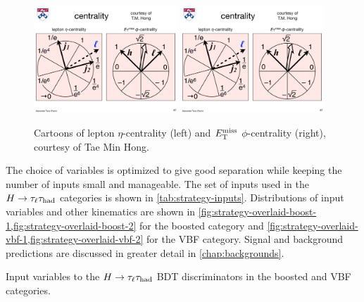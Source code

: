 \begin{figure}[tp]
  \centering
  \includegraphics[width=0.48\textwidth]{figures/backgrounds/cartoon_lepton_eta_centrality}
  \includegraphics[width=0.48\textwidth]{figures/backgrounds/cartoon_met_phi_centrality}
  \caption{Cartoons of lepton $\eta$-centrality (left) and $E_{\mathrm{T}}^{\mathrm{miss}}$ $\phi$-centrality (right), courtesy of Tae Min Hong.}
  \label{fig:strategy-centrality-cartoons}
\end{figure}

The choice of variables is optimized to give good separation while keeping the number of inputs small and manageable. The set of inputs used in the $H\rightarrow\tau_\ell\tau_\text{had}$ categories is shown in \cref{tab:strategy-inputs}. Distributions of input variables and other kinematics are shown in \cref{fig:strategy-overlaid-boost-1,fig:strategy-overlaid-boost-2} for the boosted category and \cref{fig:strategy-overlaid-vbf-1,fig:strategy-overlaid-vbf-2} for the VBF category. Signal and background predictions are discussed in greater detail in \cref{chap:backgrounds}.

\begin{table}[bp]
  \centering
  \renewcommand{\arraystretch}{1.4}
  \caption{Input variables to the $H\rightarrow\tau_\ell\tau_\text{had}$ BDT discriminators in the boosted and VBF categories.}
  
  \label{tab:strategy-inputs}
\end{table}

